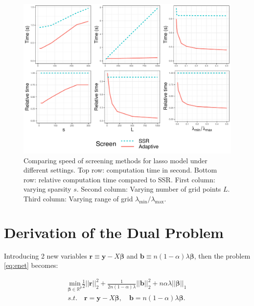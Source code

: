 \begin{figure}[h]
    \centering
    \includegraphics[width=\textwidth]{enet2.pdf}    \caption{Comparing speed of screening methods for lasso model under different settings. Top row: computation time in second. Bottom row: relative computation time compared to SSR. First column: varying sparsity $s$. Second column: Varying number of grid points $L$. Third column: Varying range of grid $\lambda_{\min}/\lambda_{\max}$.}
    \label{fig:sim1}
\end{figure}

\appendix
\appendixpage


\section{Derivation of the Dual Problem}


Introducing 2 new variables $\boldsymbol r\equiv \boldsymbol y-X\boldsymbol\beta$ and $\boldsymbol b\equiv n(1-\alpha)\lambda \boldsymbol\beta$, then the problem \eqref{eq:enet} becomes:

\begin{equation}
    \label{eq:dual+rb}
    \begin{gathered}
    \underset{\boldsymbol\beta\in \mathbb{R}^p}{\mathrm{min}}\frac{1}{2}||\boldsymbol r||_2^2+\frac{1}{2n(1-\alpha)\lambda}||\boldsymbol b||_2^2+n\alpha\lambda||\boldsymbol\beta||_1\\s.t.\quad \boldsymbol r=\boldsymbol y-X\boldsymbol\beta,\quad \boldsymbol b=n(1-\alpha)\lambda \boldsymbol\beta.
\end{gathered}
\end{equation}


